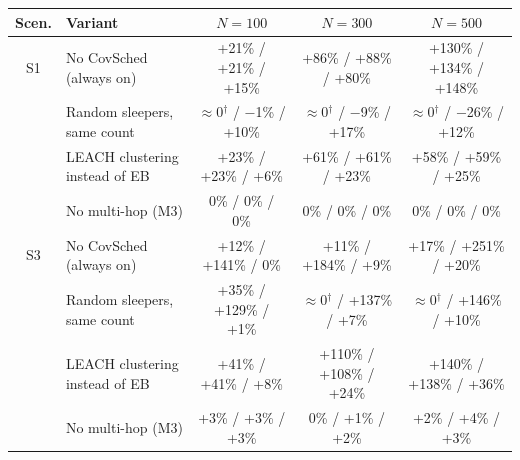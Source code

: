 \begin{tabular}{cl ccc}
\toprule
Scen. & Variant & $N{=}100$ & $N{=}300$ & $N{=}500$ \\
\midrule
S1 & No CovSched (always on) & +21\% / +21\% / +15\% & +86\% / +88\% / +80\% & +130\% / +134\% / +148\% \\
 & Random sleepers, same count & $\approx$0$^\dagger$ / $-$1\% / +10\% & $\approx$0$^\dagger$ / $-$9\% / +17\% & $\approx$0$^\dagger$ / $-$26\% / +12\% \\
 & LEACH clustering instead of EB & +23\% / +23\% / +6\% & +61\% / +61\% / +23\% & +58\% / +59\% / +25\% \\
 & No multi-hop (M3) & 0\% / 0\% / 0\% & 0\% / 0\% / 0\% & 0\% / 0\% / 0\% \\
\midrule
S3 & No CovSched (always on) & +12\% / +141\% / 0\% & +11\% / +184\% / +9\% & +17\% / +251\% / +20\% \\
 & Random sleepers, same count & +35\% / +129\% / +1\% & $\approx$0$^\dagger$ / +137\% / +7\% & $\approx$0$^\dagger$ / +146\% / +10\% \\
 & LEACH clustering instead of EB & +41\% / +41\% / +8\% & +110\% / +108\% / +24\% & +140\% / +138\% / +36\% \\
 & No multi-hop (M3) & +3\% / +3\% / +3\% & 0\% / +1\% / +2\% & +2\% / +4\% / +3\% \\
\bottomrule
\end{tabular}
